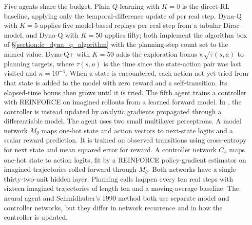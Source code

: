 Five agents share the budget. Plain $Q$-learning with $K = 0$ is the direct-RL baseline, applying only the temporal-difference update of \citet{WatkinsDayan1992} per real step. Dyna-Q with $K = 5$ applies five model-based replays per real step from a tabular Dirac model, and Dyna-Q with $K = 50$ applies fifty; both implement the algorithm box of \S\ref{section:fc_dyna_q_algorithm} with the planning-step count set to the named value.
Dyna-Q+ with $K = 50$ adds the exploration bonus $\kappa \sqrt{\tau(s, a)}$ to planning targets, where $\tau(s, a)$ is the time since the state-action pair was last visited and $\kappa = 10^{-4}$. When a state is encountered, each action not yet tried from that state is added to the model with zero reward and a self-transition. Its elapsed-time bonus then grows until it is tried.
The fifth agent trains a controller with REINFORCE on imagined rollouts from a learned forward model. In \citet{Schmidhuber1990}, the controller is instead updated by analytic gradients propagated through a differentiable model. The agent uses two small multilayer perceptrons. A model network $M_\theta$ maps one-hot state and action vectors to next-state logits and a scalar reward prediction. It is trained on observed transitions using cross-entropy for next state and mean squared error for reward. A controller network $C_\phi$ maps one-hot state to action logits, fit by a REINFORCE policy-gradient estimator on imagined trajectories rolled forward through $M_\theta$. Both networks have a single thirty-two-unit hidden layer. Planning calls happen every ten real steps with sixteen imagined trajectories of length ten and a moving-average baseline. The neural agent and Schmidhuber's 1990 method both use separate model and controller networks, but they differ in network recurrence and in how the controller is updated.

